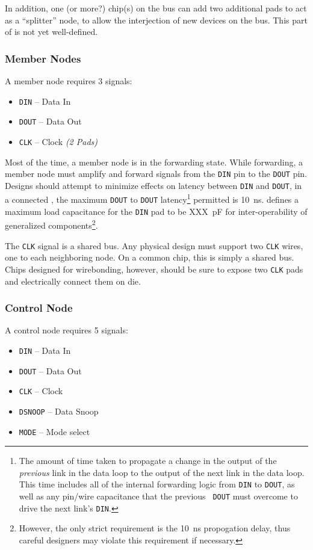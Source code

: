 In addition, one (or more?) chip(s) on the bus can add two additional pads to
act as a ``splitter'' node, to allow the interjection of new devices on the
bus. This part of \bus is not yet well-defined.

\subsubsection{Member Nodes}
\label{sec:physical-member}
A member node requires 3 signals:

\begin{itemize}
  \item {\tt DIN} -- Data In
  \item {\tt DOUT} -- Data Out
  \item {\tt CLK} -- Clock {\em (2 Pads)}
\end{itemize}

Most of the time, a member node is in the {\sc forwarding} state. While
forwarding, a member node must amplify and forward signals from the {\tt DIN}
pin to the {\tt DOUT} pin. Designs should attempt to minimize effects on
latency between {\tt DIN} and {\tt DOUT}, in a connected \bus, the maximum
{\tt DOUT} to {\tt DOUT} latency\footnote{
  The amount of time taken to propagate a change in the output of the {\em
  previous} link in the data loop to the output of the next link in the data
  loop. This time includes all of the internal forwarding logic from {\tt DIN}
  to {\tt DOUT}, as well as any pin/wire capacitance that the previous {\tt
  DOUT} must overcome to drive the next link's {\tt DIN}.}
permitted is 10~ns. \bus defines a maximum load capacitance for the {\tt DIN}
pad to be XXX~pF for inter-operability of generalized components\footnote{
  However, the only strict requirement is the 10~ns propogation delay, thus
  careful designers may violate this requirement if necessary.}.

The {\tt CLK} signal is a shared bus. Any physical design must support two
{\tt CLK} wires, one to each neighboring node. On a common chip, this is
simply a shared bus. Chips designed for wirebonding, however, should be sure
to expose two {\tt CLK} pads and electrically connect them on die.

\subsubsection{Control Node}
\label{sec:physical-control}
A control node requires 5 signals:

\begin{itemize}
  \item {\tt DIN} -- Data In
  \item {\tt DOUT} -- Data Out
  \item {\tt CLK} -- Clock
  \item {\tt DSNOOP} -- Data Snoop
  \item {\tt MODE} -- Mode select
\end{itemize}

